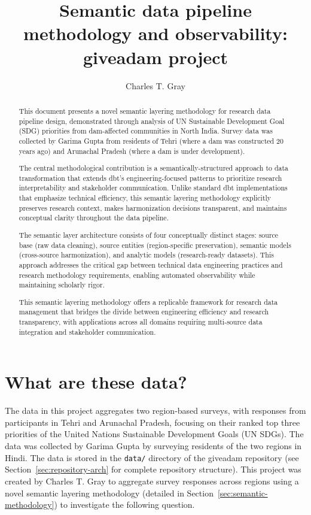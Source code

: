 \documentclass{article}
\title{Semantic data pipeline methodology and observability: giveadam project}
\author{Charles T. Gray}
\begin{document}
\maketitle



\begin{abstract}
This document presents a novel semantic layering methodology for research data pipeline design, demonstrated through analysis of UN Sustainable Development Goal (SDG) priorities from dam-affected communities in North India. Survey data was collected by Garima Gupta from residents of Tehri (where a dam was constructed 20 years ago) and Arunachal Pradesh (where a dam is under development).

The central methodological contribution is a semantically-structured approach to data transformation that extends dbt's engineering-focused patterns to prioritize research interpretability and stakeholder communication. Unlike standard dbt implementations that emphasize technical efficiency, this semantic layering methodology explicitly preserves research context, makes harmonization decisions transparent, and maintains conceptual clarity throughout the data pipeline.

The semantic layer architecture consists of four conceptually distinct stages: source base (raw data cleaning), source entities (region-specific preservation), semantic models (cross-source harmonization), and analytic models (research-ready datasets). This approach addresses the critical gap between technical data engineering practices and research methodology requirements, enabling automated observability while maintaining scholarly rigor.

This semantic layering methodology offers a replicable framework for research data management that bridges the divide between engineering efficiency and research transparency, with applications across all domains requiring multi-source data integration and stakeholder communication.

\end{abstract}

\tableofcontents

\section{What are these data?}

The data in this project aggregates two region-based surveys, with responses from participants in Tehri and Arunachal Pradesh, focusing on their ranked top three priorities of the United Nations Sustainable Development Goals (UN SDGs). The data was collected by Garima Gupta by surveying residents of the two regions in Hindi. The data is stored in the \texttt{data/} directory of the giveadam repository (see Section~\ref{sec:repository-arch} for complete repository structure). This project was created by Charles T. Gray to aggregate survey responses across regions using a novel semantic layering methodology (detailed in Section~\ref{sec:semantic-methodology}) to investigate the following question.
\end{document}
